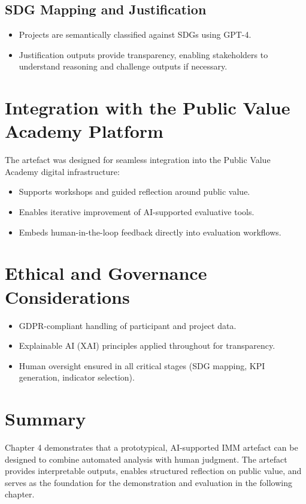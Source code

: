 \subsection{SDG Mapping and Justification}\label{subsec:sdg-mapping}

\begin{itemize}
    \item Projects are semantically classified against SDGs using GPT-4.
    \item Justification outputs provide transparency, enabling stakeholders to understand reasoning and challenge outputs if necessary.
\end{itemize}

\section{Integration with the Public Value Academy Platform}\label{sec:integration-platform}

The artefact was designed for seamless integration into the Public Value Academy digital infrastructure:

\begin{itemize}
    \item Supports workshops and guided reflection around public value.
    \item Enables iterative improvement of AI-supported evaluative tools.
    \item Embeds human-in-the-loop feedback directly into evaluation workflows.
\end{itemize}

\section{Ethical and Governance Considerations}\label{sec:ethical-governance}

\begin{itemize}
    \item GDPR-compliant handling of participant and project data.
    \item Explainable AI (XAI) principles applied throughout for transparency.
    \item Human oversight ensured in all critical stages (SDG mapping, KPI generation, indicator selection).
\end{itemize}

\section{Summary}\label{sec:artefact-summary}

Chapter 4 demonstrates that a prototypical, AI-supported IMM artefact can be designed to combine automated analysis with human judgment.
The artefact provides interpretable outputs, enables structured reflection on public value, and serves as the foundation for the demonstration and evaluation in the following chapter.